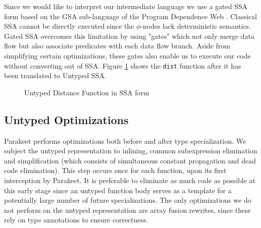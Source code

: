 \documentclass[preprint]{sigplanconf}
\begin{document}
Since we would like to interpret our intermediate language we use a gated SSA form based on the GSA sub-language of the Program Dependence Web \cite{Ott90}. Classical SSA cannot be directly executed since the $\phi$-nodes lack deterministic semantics. Gated SSA overcomes this limitation by using "gates" which not only merge data flow but also associate predicates with each data flow branch. Aside from simplifying certain optimizations, these gates also enable us to execute our code without converting out of SSA.  Figure \ref{UntypedSSADist} shows the \texttt{dist} function after it has been translated to Untyped SSA.

\begin{figure}[h!]
\caption{Untyped Distance Function in SSA form}
\label{UntypedSSADist}
\end{figure}

\subsection{Untyped Optimizations}
Parakeet performs optimizations both before and after type specialization. We subject the untyped representation to inlining, common subexpression elimination and simplification (which consists of simultaneous constant propagation and dead code elimination). This step occurs once for each function, upon its first interception by Parakeet. It is preferable to eliminate as much code as possible at this early stage since an untyped function body serves as a template for a potentially large number of future specializations. The only optimizations we do not perform on the untyped representation are array fusion rewrites, since these rely on type annotations to ensure correctness.
\end{document}
